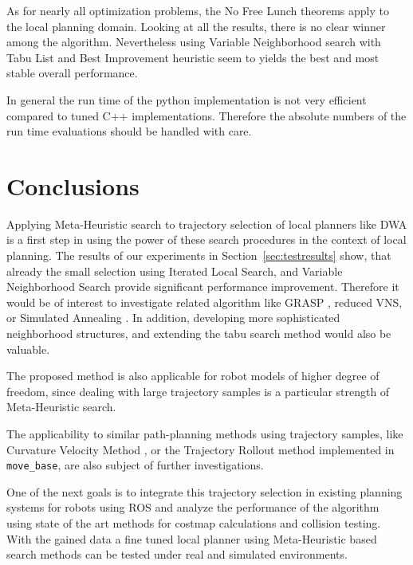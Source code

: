 As for nearly all optimization problems, the No Free Lunch theorems \cite{wolpert1997no} apply to the local planning domain. 
Looking at all the results, there is no clear winner among the algorithm. 
Nevertheless using Variable Neighborhood search with Tabu List and Best Improvement heuristic seem to yields the best and most stable overall performance. 

In general the run time of the python implementation is not very efficient compared to tuned C++ implementations. 
Therefore the absolute numbers of the run time evaluations should be handled with care. 

\section{Conclusions}

Applying Meta-Heuristic search to trajectory selection of local planners like DWA is a first step in using the power of these search procedures in the context of local planning.
The results of our experiments in Section~\ref{sec:testresults} show, that already the small selection using Iterated Local Search, and Variable Neighborhood Search provide significant performance improvement. 
Therefore it would be of interest to investigate related algorithm like GRASP \cite{feo1995grasp}, reduced VNS, or Simulated Annealing \cite{Kirkpatrick83SimulatedAnnealing}. 
In addition, developing more sophisticated neighborhood structures, and extending the tabu search method would also be valuable.

The proposed method is also applicable for robot models of higher degree of freedom, since dealing with large trajectory samples is a particular strength of Meta-Heuristic search.

The applicability to similar path-planning methods using trajectory samples, like Curvature Velocity Method \cite{simmons1996curvature}, or the Trajectory Rollout method implemented in \texttt{move\_base}, are also subject of further investigations. 

One of the next goals is to integrate this trajectory selection in existing planning systems for robots using ROS and analyze the performance of the algorithm using state of the art methods for costmap calculations and collision testing. 
With the gained data a fine tuned local planner using Meta-Heuristic based search methods can be tested under real and simulated environments.

